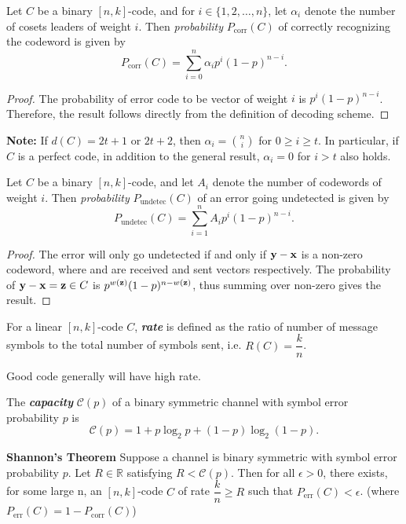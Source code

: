 \documentclass[../main.tex]{subfiles}
\begin{document}
\begin{thm}
	Let $C$ be a binary $[n,k]$-code, and for $i\in \{1,2,\ldots,n\}$, let $\alpha_i$ denote the number of cosets leaders of weight $i$. Then \emph{probability} $P_{\text{corr}}(C)$ of correctly recognizing the codeword is given by
	\[
		P_{\text{corr}}(C) = \displaystyle\sum_{i=0}^{n}\alpha_ip^i(1-p)^{n-i}.
	\]
\end{thm}
\begin{proof}
	The probability of error code to be vector of weight $i$ is $p^i(1-p)^{n-i}$. Therefore, the result follows directly from the definition of decoding scheme.
\end{proof}
\textbf{Note:} If $d(C)=2t+1$ or $2t+2$, then $\alpha_i=\binom{n}{i}$ for $0\geq i\geq t$. In particular, if $C$ is a perfect code, in addition to the general result, $\alpha_i=0$ for $i>t$ also holds.

\begin{thm}\label{thm_undetec_prob}
	Let $C$ be a binary $[n,k]$-code, and let $A_i$ denote the number of codewords of weight $i$. Then \emph{probability} $P_{\text{undetec}}(C)$ of an error going undetected is given by
	\[
		P_{\text{undetec}}(C) = \displaystyle\sum_{i=1}^{n}A_ip^i(1-p)^{n-i}.
	\]
\end{thm}
\begin{proof}
	The error will only go undetected if and only if $\textbf{y}-\textbf{x}$ is a non-zero codeword, where  and  are received and sent vectors respectively. The probability of $\textbf{y}-\textbf{x} = \textbf{z}\in C$ is $p^{w(\textbf{z})}(1-p)^{n-w(\textbf{z})}$, thus summing over non-zero  gives the result. 
\end{proof}

\begin{defn}
	For a linear $[n,k]$-code $C$, \textbf{\emph{rate}} is defined as the ratio of number of message symbols to the total number of symbols sent, i.e. $R(C)=\dfrac{k}{n}$.
\end{defn}
Good code generally will have high rate.
\begin{defn}
	The \textbf{\emph{capacity}} $\mathscr{C}(p)$ of a binary symmetric channel with symbol error probability $p$ is
	\[
		\mathscr{C}(p) = 1 + p\log_2p + (1-p)\log_2(1-p).
	\] 
\end{defn}

\begin{thm}{\textbf{Shannon's Theorem}}
	Suppose a channel is binary symmetric with symbol error probability $p$. Let $R\in \mathbb{R}$ satisfying $R<\mathscr{C}(p)$. Then for all $\epsilon > 0$, there exists, for some large n, an $[n,k]$-code $C$ of rate $\dfrac{k}{n} \geq R$ such that $P_{\text{err}}(C)<\epsilon$. (where $P_{\text{err}}(C) = 1-P_{\text{corr}}(C)$)
\end{thm}
\end{document}
